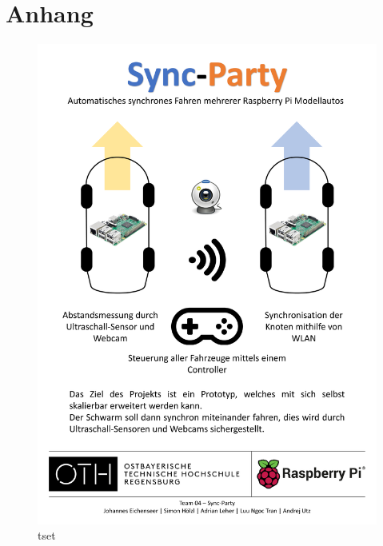 \appendix
\chapter{Anhang}
\clearpage
\begin{figure}[h]
\includegraphics[width=\linewidth]{Sync-Party_Plakat.pdf}
\caption{tset}
\label{pic:plakat}
\end{figure}